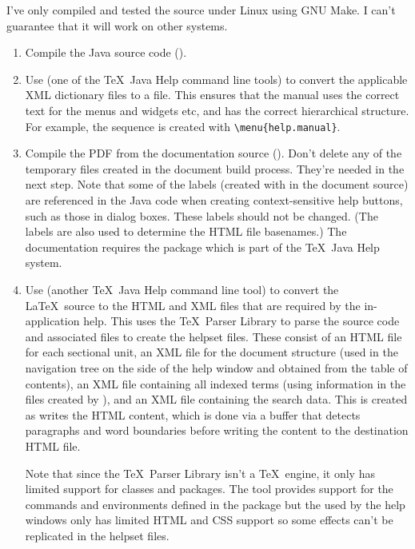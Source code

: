 I've only compiled and tested the source under Linux using GNU Make.
I can't guarantee that it will work on other systems.

\begin{enumerate}
\item Compile the Java source code ().

\item Use  (one of the \TeX\ Java Help command
line tools) to convert the applicable XML dictionary files to 
a  file. This ensures that the manual uses the
correct text for the menus and widgets etc, and has the correct
hierarchical structure. For example, the sequence
 is created with
\verb|\menu{help.manual}|.

\item Compile the PDF from the documentation source
(). Don't delete any of the temporary
files created in the document build process. They're needed in the
next step. Note that some of the labels (created with 
in the document source) are referenced in the Java code when
creating context-sensitive help buttons, such as those in dialog
boxes. These labels should not be changed. (The labels are also used
to determine the HTML file basenames.)
The documentation requires the  package which is
part of the \TeX\ Java Help system.

\item Use  (another \TeX\ Java Help command
line tool) to convert the \LaTeX\ source to the HTML and XML files
that are required by the in-application help.
This uses the \TeX\ Parser Library to parse the source code and 
associated files to create the helpset files. These consist of an
HTML file for each sectional unit, an XML file for the document
structure (used in the navigation tree on the side of the help
window and obtained from the table of contents), 
an XML file containing all indexed terms (using
information in the files created by ), and
an XML file containing the search data. This is created as
 writes the HTML content, which is done via a
buffer that detects paragraphs and word boundaries before writing
the content to the destination HTML file.

Note that since the \TeX\ Parser Library isn't a \TeX\ engine, it
only has limited support for classes and packages. The
 tool provides support for the commands and
environments defined in the  package but
the  used by the help windows only has limited
HTML and CSS support so some effects can't be replicated in the
helpset files.

\end{enumerate}

